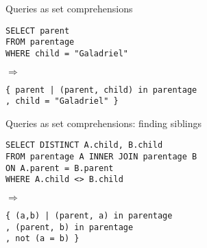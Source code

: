 \documentclass[xcolor=table,usenames,dvipsnames,svgnames]{beamer}
\newcommand{\df}{\color{RoyalBlue}}
\renewcommand{\df}{}
\begin{document}

\begin{frame}{Queries as set comprehensions}\Large\centering
  \begin{minipage}{0.7\textwidth}
    \texttt{SELECT {\color{orange}parent}\\
      FROM {\color{Green}parentage}\\
      WHERE {\color{violet}child = "Galadriel"}}
  \end{minipage}

  \pause
  \vspace{1.5em}
  {\LARGE $\Longrightarrow$}
  \vspace{1em}

  \begin{minipage}{1.0\textwidth}
    \df\tt \{ {\color{orange}parent}
    | {\color{Green}(parent, child) in parentage}\\
    , {\color{violet}child = "Galadriel"} \}
  \end{minipage}
\end{frame}

\begin{frame}{Queries as set comprehensions: finding siblings}\large\centering
  \begin{minipage}{0.9\textwidth}
    \tt SELECT DISTINCT {\color{orange}A.child, B.child}\\
    FROM {\color{Green}parentage A} INNER JOIN {\color{RoyalBlue}parentage B}\\
    ON {A.parent = B.parent}
    \\WHERE {\color{violet}A.child <> B.child}
  \end{minipage}

  \vspace{1.5em}
  {\LARGE $\Longrightarrow$}
  \vspace{1em}

  \begin{minipage}{0.8\textwidth}
    \df\tt\{ {\color{orange}(a,b)}
    | {\color{Green}({parent}, a) in parentage}\\
    , {\color{RoyalBlue}({parent}, b) in parentage}\\
    , {\color{violet}not (a = b)} \}
  \end{minipage}
\end{frame}


\end{document}
